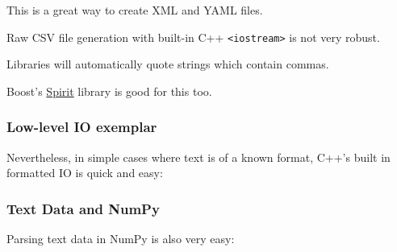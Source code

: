This is a great way to create XML and YAML files.

Raw CSV file generation with built-in C++
\texttt{\textless{}iostream\textgreater{}} is not very robust.

Libraries will automatically quote strings which contain commas.

Boost's \href{http://boost-spirit.com/home/}{Spirit} library is good for
this too.

\subsubsection{Low-level IO exemplar}\label{low-level-io-exemplar}

Nevertheless, in simple cases where text is of a known format, C++'s
built in formatted IO is quick and easy:

\begin{Shaded}
\begin{Highlighting}[]

  
     
\NormalTok{\}}
\end{Highlighting}
\end{Shaded}

\begin{Shaded}
\begin{Highlighting}[]

 
    \NormalTok{(} 
      \NormalTok{(} 
        \NormalTok{;}
     \NormalTok{\}}
   \NormalTok{\}}
\NormalTok{\}}
\end{Highlighting}
\end{Shaded}

\subsubsection{Text Data and NumPy}\label{text-data-and-numpy}

Parsing text data in NumPy is also very easy:

